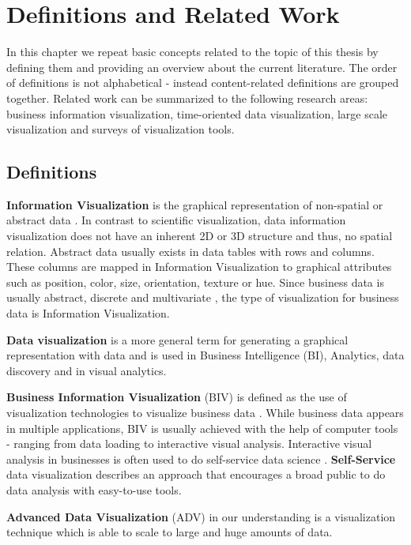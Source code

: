 \chapter{Definitions and Related Work}
\label{chap:concepts}
In this chapter we repeat basic concepts related to the topic of this thesis by defining them and providing an overview about the current literature. The order of definitions is not alphabetical - instead content-related definitions are grouped together. Related work can be summarized to the following research areas: business information visualization,  time-oriented data visualization, large scale visualization and surveys of visualization tools. 

\section{Definitions}
\textbf{Information Visualization} is the graphical representation of non-spatial or abstract data  \cite{Keim2006}. In contrast to scientific visualization, data information visualization does not have an inherent 2D or 3D structure  \cite{Shneiderman2008} and thus, no spatial relation. Abstract data usually exists in data tables with rows and columns. These columns are mapped in Information Visualization to graphical attributes such as position, color, size, orientation, texture or hue. 
Since business data is usually abstract, discrete and multivariate  \cite{Tegarden1999}, the type of visualization for business data is Information Visualization.
\par
\textbf{Data visualization} is a more general term for generating a graphical representation with data and is used in Business Intelligence (\gls{BI}), Analytics, data discovery and in visual analytics.
\par
\textbf{Business Information Visualization} (\gls{BIV}) \label{BIV} is defined as the use of visualization technologies to visualize business data  \cite{Tegarden1999}. While business data appears in multiple applications, \gls{BIV} is usually achieved with the help of computer tools - ranging from data loading to interactive visual analysis. Interactive visual analysis in businesses is often used to do self-service data science \cite{Russom2011,Parenteau2016,SAS2012,Curran2005}. \textbf{Self-Service} data visualization describes an approach that encourages a broad public to do data analysis with easy-to-use tools.
\par
\textbf{Advanced Data Visualization} (\gls{ADV}) in our understanding is a visualization technique which is able to scale to large and huge amounts of data.
